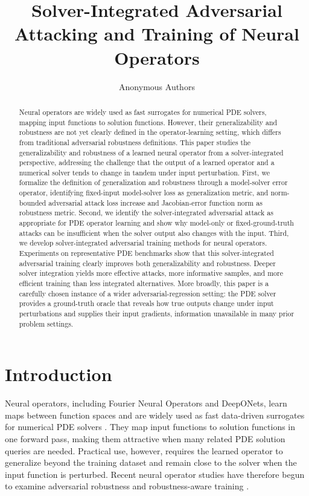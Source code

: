 \documentclass{article}
\title{Solver-Integrated Adversarial Attacking and Training of Neural Operators}
\author{Anonymous Authors}
\begin{document}
\maketitle
\begin{abstract}
Neural operators are widely used as fast surrogates for numerical PDE
solvers, mapping input functions to solution functions. However, their
generalizability and robustness are not yet clearly defined in the
operator-learning setting, which differs from traditional adversarial robustness
definitions. This paper studies the generalizability and robustness of a
learned neural operator from a solver-integrated perspective, addressing the
challenge that the output of a learned operator and a numerical solver tends to
change in tandem under input perturbation. First, we formalize the definition
of generalization and robustness through a model-solver error operator,
identifying fixed-input model-solver loss as generalization metric, and
norm-bounded adversarial attack loss increase and Jacobian-error function norm as
robustness metric. Second, we
identify the solver-integrated adversarial attack as appropriate
for PDE operator learning and show why model-only or fixed-ground-truth attacks
can be insufficient when the solver output also changes with the input. Third, we
develop solver-integrated adversarial training methods for neural operators.
Experiments on representative PDE benchmarks show that this solver-integrated
adversarial training clearly improves both generalizability and robustness.
Deeper solver integration yields more effective attacks, more informative
samples, and more efficient training than less integrated alternatives. More
broadly, this paper is a carefully chosen instance of a wider
adversarial-regression setting: the PDE solver provides a ground-truth oracle
that reveals how true outputs change under input perturbations and supplies
their input gradients, information unavailable in many prior problem settings.
\end{abstract}

\section{Introduction}

Neural operators, including Fourier Neural Operators and DeepONets, learn maps
between function spaces and are widely used as fast data-driven
surrogates for numerical PDE solvers \citep{li2021fourier,lu2021deeponet}.
They map input functions to solution functions in one forward pass, making them
attractive when many related PDE solution queries are needed. Practical use, however,
requires the learned operator to generalize beyond the training dataset and
remain close to the solver when the input function is perturbed. Recent neural
operator studies have therefore begun to examine adversarial robustness and
robustness-aware training
\citep{adesoji2022evaluating,huang2026stablepdenet,roy2026beyond}.
\end{document}
